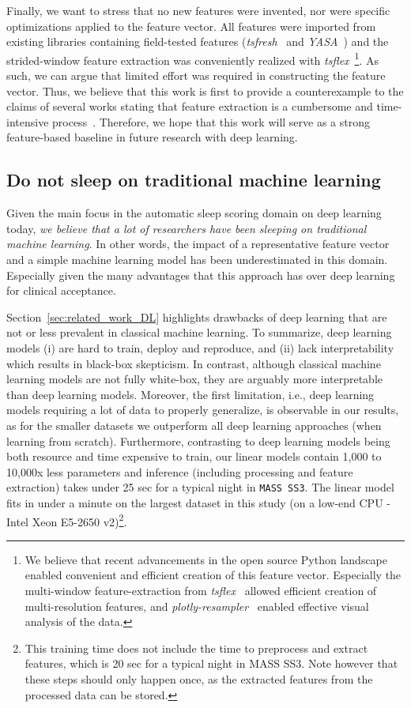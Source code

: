 \documentclass[runningheads]{llncs}
\begin{document}
Finally, we want to stress that no new features were invented, nor were specific optimizations applied to the feature vector. All features were imported from existing libraries containing field-tested features (\textit{tsfresh}~\cite{christ2018tsfresh} and \textit{YASA}~\cite{vallat2021open}) and the strided-window feature extraction was conveniently realized with \textit{tsflex}~\cite{vanderdonckt2021tsflex}\footnote{We believe that recent advancements in the open source Python landscape enabled convenient and efficient creation of this feature vector. Especially the multi-window feature-extraction from \textit{tsflex}~\cite{vanderdonckt2021tsflex} allowed efficient creation of multi-resolution features, and \textit{plotly-resampler}~\cite{vanderdonckt2022plotly_resampler} enabled effective visual analysis of the data.}.
As such, we can argue that limited effort was required in constructing the feature vector. Thus, we believe that this work is first to provide a counterexample to the claims of several works stating that feature extraction is a cumbersome and time-intensive process~\cite{mousavi2019sleepeegnet,supratak2017deepsleepnet,seo2020iitnet}. Therefore, we hope that this work will serve as a strong feature-based baseline in future research with deep learning.

\subsection{Do not sleep on traditional machine learning}
Given the main focus in the automatic sleep scoring domain on deep learning today, \textit{we believe that a lot of researchers have been sleeping on traditional machine learning}. In other words, the impact of a representative feature vector and a simple machine learning model has been underestimated in this domain. Especially given the many advantages that this approach has over deep learning for clinical acceptance.

Section~\ref{sec:related_work_DL} highlights drawbacks of deep learning that are not or less prevalent in classical machine learning. To summarize, deep learning models (i) are hard to train, deploy and reproduce, and (ii) lack interpretability which results in black-box skepticism.
In contrast, although classical machine learning models are not fully white-box, they are arguably more interpretable than deep learning models. Moreover, the first limitation, i.e., deep learning models requiring a lot of data to properly generalize, is observable in our results, as for the smaller datasets we outperform all deep learning approaches (when learning from scratch). Furthermore, contrasting to deep learning models being both resource and time expensive to train, our linear models contain 1,000 to 10,000x less parameters and inference (including processing and feature extraction) takes under 25 sec for a typical night in \texttt{MASS SS3}. The linear model fits in under a minute on the largest dataset in this study (on a low-end CPU - Intel Xeon E5-2650 v2)\footnote{This training time does not include the time to preprocess and extract features, which is  20 sec for a typical night in MASS SS3. Note however that these steps should only happen once, as the extracted features from the processed data can be stored.}.
\end{document}
